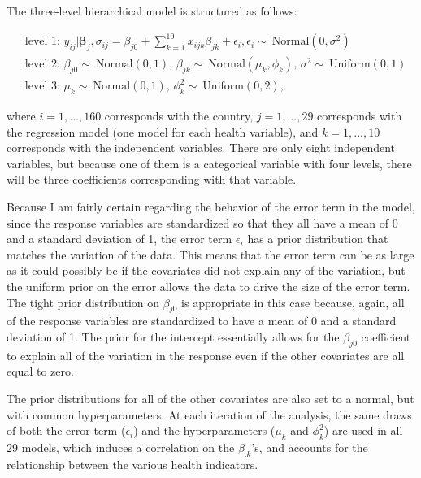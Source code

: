The three-level hierarchical model is structured as follows:

\begin{equation}
\begin{split}
&\text{level 1: } y_{ij}|\boldsymbol{\beta}_{j},\sigma_{ij} = \beta_{j0} + \sum_{k=1}^{10} x_{ijk} \beta_{jk} + \epsilon_{i}, \epsilon_{i} \sim\ \text{Normal}(0,\sigma^2) \\
&\text{level 2: } \beta_{j0} \sim\ \text{Normal}(0,1) \text{, } \beta_{jk} \sim\ \text{Normal}(\mu_{k},\phi_{k}) \text{, } \sigma^2 \sim\ \text{Uniform}(0,1) \\
&\text{level 3: } \mu_{k} \sim\ \text{Normal}(0,1) \text{, } \phi_{k}^2 \sim\ \text{Uniform}(0, 2), 
\end{split}
\end{equation}

where $i=1,...,160$ corresponds with the country, $j=1,...,29$ corresponds with the regression model (one model for each health variable), and $k=1,...,10$ corresponds with the independent variables. There are only eight independent variables, but because one of them is a categorical variable with four levels, there will be three coefficients corresponding with that variable.

Because I am fairly certain regarding the behavior of the error term in the model, since the response variables are standardized so that they all have a mean of 0 and a standard deviation of 1, the error term $\epsilon_{i}$ has a prior distribution that matches the variation of the data. This means that the error term can be as large as it could possibly be if the covariates did not explain any of the variation, but the uniform prior on the error allows the data to drive the size of the error term. The tight prior distribution on $\beta_{j0}$ is appropriate in this case because, again, all of the response variables are standardized to have a mean of 0 and a standard deviation of 1. The prior for the intercept essentially allows for the $\beta_{j0}$ coefficient to explain all of the variation in the response even if the other covariates are all equal to zero.  

The prior distributions for all of the other covariates are also set to a normal, but with common hyperparameters. At each iteration of the analysis, the same draws of both the error term ($\epsilon_i$) and the hyperparameters ($\mu_k$ and $\phi_k^2$) are used in all 29 models, which induces a correlation on the $\beta_{.k}$'s, and accounts for the relationship between the various health indicators.

